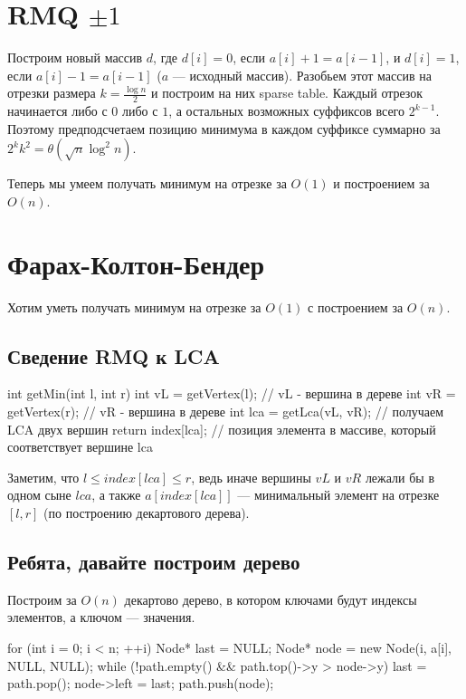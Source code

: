 \section{RMQ \texorpdfstring{$\pm1$}{+-1}}
Построим новый массив $d$, где $d[i] = 0$, если $a[i] + 1 = a[i - 1]$, и $d[i] = 1$, если $a[i] - 1 = a[i - 1]$ ($a$ --- исходный массив).
Разобьем этот массив на отрезки размера $k = \frac{\log n}{2}$ и построим на них sparse table.
Каждый отрезок начинается либо с $0$ либо с $1$, а остальных возможных суффиксов всего $2^{k-1}$. Поэтому предподсчетаем 
позицию минимума в каждом суффиксе суммарно за $2^k k^2 = \theta(\sqrt{n} \log^2 n)$.

Теперь мы умеем получать минимум на отрезке за $O(1)$ и построением за $O(n)$.

\section{Фарах-Колтон-Бендер}
Хотим уметь получать минимум на отрезке за $O(1)$ с построением за $O(n)$.

\subsection{Сведение RMQ к LCA}
\begin{cppcode}
int getMin(int l, int r) {
	int vL = getVertex(l); // vL - вершина в дереве
	int vR = getVertex(r); // vR - вершина в дереве
	int lca = getLca(vL, vR); // получаем LCA двух вершин
	return index[lca]; // позиция элемента в массиве, который соответствует вершине lca
}
\end{cppcode}

Заметим, что $l \le index[lca] \le r$, ведь иначе вершины $vL$ и $vR$ лежали бы в одном сыне $lca$,
а также $a[index[lca]]$ --- минимальный элемент на отрезке $[l, r]$ (по построению декартового дерева).

\subsection{Ребята, давайте построим дерево}
Построим за $O(n)$ декартово дерево, в котором ключами будут индексы элементов, а ключом --- значения.

\begin{cppcode}
for (int i = 0; i < n; ++i) {
	Node* last = NULL;
	Node* node = new Node(i, a[i], NULL, NULL);
	while (!path.empty() && path.top()->y > node->y)
		last = path.pop();
	node->left = last;
	path.push(node);
}
\end{cppcode}

